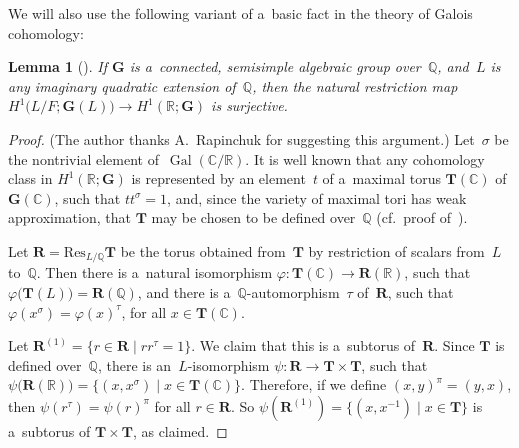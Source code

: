 \documentclass[pdftex]{sigma}
\DeclareMathOperator{\Gal}{Gal}
\numberwithin{equation}{section}
\newtheorem{lem}[prop]{Lemma}
{\theoremstyle{definition}
\newtheorem{defn}[prop]{Definition}
\newtheorem{notation}[prop]{Notation}
\newtheorem{rem}[prop]{Remark}
\newtheorem{ques}[prop]{Question}
\newtheorem{eg}[prop]{Example}
\newtheorem{erratum}[prop]{Erratum}}
\begin{document}
We will also use the following variant of a~basic fact in the theory of Galois cohomology:

\begin{lem}[]\label{KneserHasse}
If $\mathbf{G}$ is a~connected, semisimple algebraic group over~$\mathbb{Q}$, and~$L$ is any imaginary quadratic
extension of~$\mathbb{Q}$, then the natural restriction map $H^1 \bigl(L/F; \mathbf{G}(L) \bigr) \to H^1 (\mathbb{R};
\mathbf{G})$ is surjective.
\end{lem}

\begin{proof}(The author thanks A.~Rapinchuk for suggesting this argument.) Let~$\sigma$ be the nontrivial element of~$\Gal(\mathbb{C}/\mathbb{R})$.
It is well known that any cohomology class in $H^1(\mathbb{R}; \mathbf{G})$ is represented by an element~$t$ of
a~maximal torus $\mathbf{T}(\mathbb{C})$ of $\mathbf{G}(\mathbb{C})$, such that $t t^\sigma = 1$, and, since the variety
of maximal tori has weak approximation, that $\mathbf{T}$ may be chosen to be def\/ined over~$\mathbb{Q}$ (cf.\ proof
of~\cite[Proposition~6.17, p.~337]{PlatonovRapinchukBook}).

Let $\mathbf{R} = \mathrm{Res}_{L/\mathbb{Q}} \mathbf{T}$ be the torus obtained from~$\mathbf{T}$ by restriction of
scalars from~$L$ to~$\mathbb{Q}$.
Then there is a~natural isomorphism $\varphi \colon \mathbf{T}(\mathbb{C}) \to \mathbf{R}(\mathbb{R})$, such that
$\varphi \bigl(\mathbf{T}(L) \bigr) = \mathbf{R}(\mathbb{Q})$, and there is a~$\mathbb{Q}$-automorphism~$\tau$
of~$\mathbf{R}$, such that $\varphi(x^\sigma) = \varphi(x)^\tau$, for all $x \in \mathbf{T}(\mathbb{C})$.

Let $\mathbf{R}^{(1)} = \{ r \in \mathbf{R} \mid r r^\tau = 1 \}$.
We claim that this is a~subtorus of~$\mathbf{R}$.
Since $\mathbf{T}$ is def\/ined over~$\mathbb{Q}$, there is an~$L$-isomorphism $\psi \colon \mathbf{R} \to \mathbf{T}
\times \mathbf{T}$, such that $\psi \bigl(\mathbf{R}(\mathbb{R}) \bigr) = \{ (x, x^\sigma) \mid x \in
\mathbf{T}(\mathbb{C}) \}$.
Therefore, if we def\/ine $(x,y)^\pi = (y,x)$, then $\psi(r^\tau) = \psi(r)^\pi$ for all $r \in \mathbf{R}$.
So $\psi(\mathbf{R}^{(1)}) = \{ (x, x^{-1}) \mid x \in \mathbf{T} \}$ is a~subtorus of $\mathbf{T} \times \mathbf{T}$,
as claimed.


\end{proof}
\end{document}
